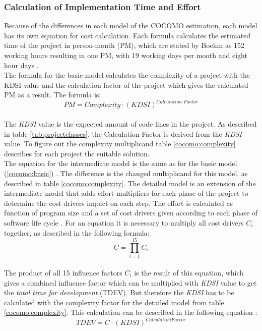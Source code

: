 \subsubsection{Calculation of Implementation Time and Effort}

Because of the differences in each model of the COCOMO estimation, each model has its own equation for cost calculation. Each formula calculates the estimated time of the project in person-month (PM), which are stated by Boehm as 152 working hours resulting in one PM, with 19 working days per month and eight hour days \cite{boehm}. \\
The formula for the basic model calculates the complexity of a project with the KDSI value and the calculation factor of the project which gives the calculated PM as a result. The formula is:\\
\begin{equation}
\textit{PM} = \textit{Complexity} \cdot (\textit{KDSI})^{\textit{Calculation Factor}} \label{cocomo:basic}
\end{equation}\\
The \textit{KDSI} value is the expected amount of code lines in the project. As described in table \ref{tab:projectclasses}, the Calculation Factor is derived from the \textit{KDSI} value. To figure out the complexity multiplicand table \ref{cocomo:complexity} describes for each project the suitable solution.\\
The equation for the intermediate model is the same as for the basic model (\ref{cocomo:basic}) \cite{boehm}. The difference is the changed multiplicand for this model, as described in table \ref{cocomo:complexity}. The detailed model is an extension of the intermediate model that adds effort multipliers for each phase of the project to determine the cost drivers impact on each step. The effort is calculated as function of program size and a set of cost drivers given according to each phase of software life cycle \cite{boehm}. For an equation it is necessary to multiply all cost drivers \textbf{\(C_i\)} together, as described in the following formula:\\
\begin{equation}
C = \prod \limits_{i=1}^{15} C_i \label{cocomo:detailedcostdrivers}
\end{equation}\\
The product of all 15 influence factors $C_i$ is the result of this equation, which 
gives a combined influence factor which can be multiplied with \textit{KDSI} value to get the \textit{total time for development} (TDEV). But therefore the \textit{KDSI} has to be calculated with the complexity factor for the detailed model from table \ref{cocomo:complexity}. This calculation can be described in the following equation \cite{boehm}:\\
\begin{equation}
TDEV = C \cdot (KDSI)^{Calculation Factor} \label{cocomo:detailed}
\end{equation}\\


